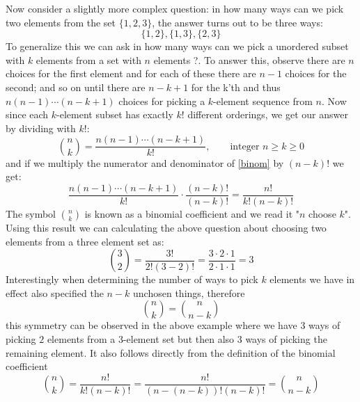\myindent Now consider a slightly more complex question: in how many ways can we pick two 
elements from the set $\{1,2,3\}$, the answer turns out to be three ways: 
\[
\{1, 2\}, \{1, 3\}, \{2, 3\}
\]
To generalize this we can ask in how many ways can we pick a unordered subset with $k$ elements from a set with $n$
elements ?. To answer this, observe there are $n$ choices for the first element and for each of these there are 
$n - 1$ choices for the second; and so on until there are $n - k + 1$ for the k'th and thus $n(n-1) \cdots (n - k + 1)$ 
choices for picking a $k$-element sequence from $n$. Now since each $k$-element subset has exactly $k!$ different 
orderings, we get our answer by dividing with $k!$:
\begin{equation}\label{binom}
\binom{n}{k} = \frac{n(n-1) \cdots (n - k + 1)}{k!},  \qquad \text{integer } n \geq k \geq 0
\end{equation}
and if we multiply the numerator and denominator of \ref{binom} by $(n - k)!$ we get:
\[
\frac{n(n-1) \cdots (n - k + 1)}{k!} \cdot \frac{(n - k)!}{(n - k)!} =  \frac{n!}{k!(n-k)!}
\]
The symbol $\binom{n}{k}$ is known as a binomial coefficient and we read it "$n$ choose $k$". Using this result we can
calculating the above question about choosing two elements from a three element set as:
\[
\binom{3}{2}  = \frac{3!}{2! (3-2)!} = \frac{3 \cdot 2 \cdot 1}{2 \cdot 1 \cdot 1} = 3
\]
Interestingly when determining the number of ways to pick $k$ elements we have in effect also specified the $n-k$
unchosen things, therefore 
\begin{equation}\label{binom_symmetry}
\binom{n}{k} = \binom{n}{n-k} 
\end{equation}
this symmetry can be observed in the above example where we have $3$ ways of picking $2$ elements from a $3$-element set
but then also $3$ ways of picking the remaining element. It also follows directly from the definition of the binomial
coefficient 
\[
\binom{n}{k} =  \frac{n!}{k!(n-k)!} =  \frac{n!}{(n-(n-k))!(n-k)!} = \binom{n}{n-k}
\]

